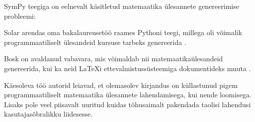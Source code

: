 
SymPy teegiga on eelnevalt käsitletud matemaatika ülesannete genereerimise probleemi:

Solar arendas oma bakalaureusetöö raames Pythoni teegi, millega oli võimalik programmaatiliselt ülesandeid kursuse tarbeks genereerida \cite{solargenerating}. 

Bosk on avaldanud vabavara, mis võimaldab nii matemaatikaülesandeid genereerida, kui ka neid LaTeXi ettevalmistussüsteemiga dokumentideks muuta \cite{examgen}.

Käesoleva töö autorid leiavad, et olemasolev kirjandus on küllastunud pigem programmaatiliselt matemaatika ülesannete lahendamisega, kui nende loomisega. Lisaks pole veel piisavalt uuritud kuidas tõhusaimalt pakendada taolisi lahendusi kasutajasõbralikku liidesesse.

